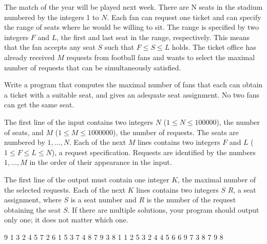 





The match of the year will be played next week. There are N seats in the stadium numbered by the integers 1 to $N$. Each fan can request one ticket and can specify the range of seats where he would be willing to sit. The range is specified by two integers $F$ and $L$, the first and last seat in the range, respectively. This means that the fan accepts any seat $S$ such that $F \leq S \leq L$ holds. The ticket office has already received $M$ requests from football fans and wants to select the maximal number of requests that can be simultaneously satisfied.

Write a program that computes the maximal number of fans that each can obtain a ticket with a suitable seat, and gives an adequate seat assignment. No two fans can get the same seat.

The first line of the input contains two integers $N$ ($1 \leq N \leq 100000$), the number of seats, and $M$ ($1 \leq M \leq 1000000$), the number of requests. The seats are numbered by $1,\ldots,N$. Each of the next $M$ lines contains two integers $F$ and $L$ ($1 \leq F \leq L \leq N$), a request specification. Requests are identified by the numbers $1,\ldots,M$ in the order of their appearance in the input.

The first line of the output must contain one integer $K$, the maximal number of the selected requests. Each of the next $K$ lines contains two integers $S$ $R$, a seat assignment, where $S$ is a seat number and $R$ is the number of the request obtaining the seat $S$. If there are multiple solutions, your program should output only one; it does not matter which one.

 9
1 3
2 4
5 7
2 6
1 5
3 7
4 8
7 9
3 8
1 1
2 5
3 2
4 4
5 6
6 9
7 3
8 7
9 8
\sampleCOMMENT

\sampleEND
\bigskip


